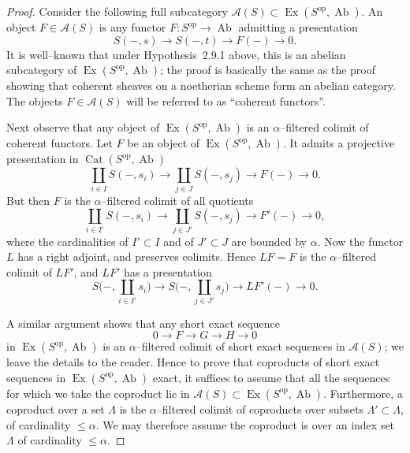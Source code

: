 \documentclass[11pt,a4paper]{article}
\theoremstyle{plain}
\theoremstyle{definition}
\DeclareMathOperator{\Cat}{Cat}
\DeclareMathOperator{\Ex}{Ex}
\DeclareMathOperator{\Ab}{Ab}
\newcommand{\op}{\mathrm{op}}
\numberwithin{equation}{section}
\begin{document}
\begin{proof}
Consider the following full subcategory $\mathcal{A}(S) \subset \Ex(S^{\op},\Ab)$. An object $F \in \mathcal{A}(S)$ is any functor $F: S^{\op} \to \Ab$ admitting a presentation
\begin{equation*}
S(-,s) \longrightarrow S(-,t) \longrightarrow F(-) \longrightarrow 0.
\end{equation*}
It is well--known that under Hypothesis~2.9.1 above, this is an abelian subcategory of $\Ex(S^{\op},\Ab)$; the proof is basically the same as the proof showing that coherent sheaves on a noetherian scheme form an abelian category. The objects $F \in \mathcal{A}(S)$ will be referred to as ``coherent functors''.

Next observe that any object of $\Ex(S^{\op},\Ab)$ is an $\alpha$--filtered colimit of coherent functors. Let $F$ be an object of $\Ex(S^{\op},\Ab)$. It admits a projective presentation in $\Cat(S^{\op},\Ab)$
\begin{equation*}
\coprod_{i\in I} S(-,s_{i}) \longrightarrow \coprod_{j\in J} S(-,s_{j}) \longrightarrow F(-) \longrightarrow 0.
\end{equation*}
But then $F$ is the $\alpha$--filtered colimit of all quotients
\begin{equation*}
\coprod_{i\in I'} S(-,s_{i}) \longrightarrow \coprod_{j\in J'} S(-,s_{j}) \longrightarrow F'(-) \longrightarrow 0,
\end{equation*}
where the cardinalities of $I' \subset I$ and of $J' \subset J$ are bounded by $\alpha$. Now the functor $L$ has a right adjoint, and preserves colimits. Hence $LF = F$ is the $\alpha$--filtered colimit of $LF'$, and $LF'$ has a presentation
\begin{equation*}
S\Big(-,\coprod_{i\in I'} s_{i}\Big) \longrightarrow S\Big(-,\coprod_{j\in J'} s_{j}\Big) \longrightarrow LF'(-) \longrightarrow 0.
\end{equation*}

A similar argument shows that any short exact sequence
\begin{equation*}
0 \longrightarrow F \longrightarrow G \longrightarrow H \longrightarrow 0
\end{equation*}
in $\Ex(S^{\op},\Ab)$ is an $\alpha$--filtered colimit of short exact sequences in $\mathcal{A}(S)$; we leave the details to the reader. Hence to prove that coproducts of short exact sequences in $\Ex(S^{\op},\Ab)$ exact, it suffices to assume that all the sequences for which we take the coproduct lie in $\mathcal{A}(S) \subset \Ex(S^{\op},\Ab)$. Furthermore, a coproduct over a set $\Lambda$ is the $\alpha$--filtered colimit of coproducts over subsets $\Lambda' \subset \Lambda$, of cardinality $\leq\alpha$. We may therefore assume the coproduct is over an index set $\Lambda$ of cardinality $\leq\alpha$.


\end{proof}
\end{document}
